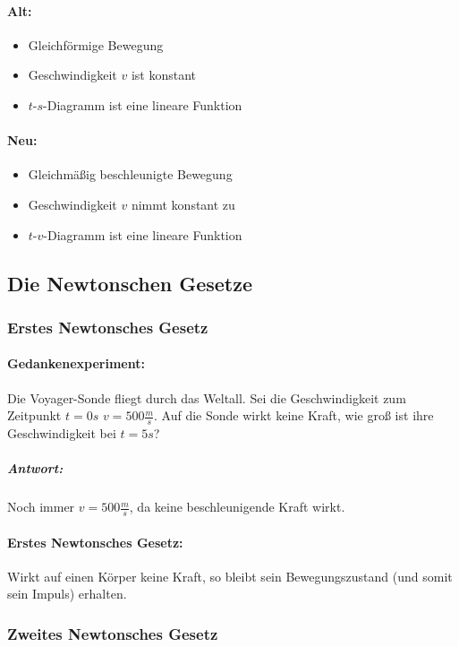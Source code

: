 	\paragraph{Alt:}
	\begin{itemize}
		\item Gleichförmige Bewegung
		\item Geschwindigkeit $ v $ ist konstant
		\item $ t $-$ s $-Diagramm ist eine lineare Funktion
	\end{itemize}
	\paragraph{Neu:}
	\begin{itemize}
		\item Gleichmäßig beschleunigte Bewegung
		\item Geschwindigkeit $ v $ nimmt konstant zu
		\item $ t $-$ v $-Diagramm ist eine lineare Funktion
	\end{itemize}

	\subsection{Die Newtonschen Gesetze}
	\subsubsection{Erstes Newtonsches Gesetz}
	\paragraph{Gedankenexperiment:}
	Die Voyager-Sonde fliegt durch das Weltall. Sei die Geschwindigkeit zum Zeitpunkt $ t=0s $ $ v=500\frac{m}{s} $. Auf die Sonde wirkt keine Kraft, wie groß ist ihre Geschwindigkeit bei $ t=5s $?
	\subparagraph{Antwort:}
	Noch immer $ v=500\frac{m}{s} $, da keine beschleunigende Kraft wirkt.
	\paragraph{Erstes Newtonsches Gesetz:}
	Wirkt auf einen Körper keine Kraft, so bleibt sein Bewegungszustand (und somit sein Impuls) erhalten.
	
	\subsubsection{Zweites Newtonsches Gesetz}

